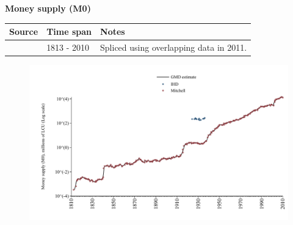 \documentclass[12pt,a4paper,landscape]{article}
\begin{document}
\begin{adjustbox}{max totalsize={\paperwidth}{\paperheight},center}
\begin{minipage}[t][\textheight][t]{\textwidth}
\vspace*{0.5cm}
{}
\begin{center}
{\Large\bfseries Money supply (M0)}
\end{center}
\vspace{0.5cm}
\begin{table}[H]
\centering
\small
\begin{tabular}{|l|l|l|}
\hline
\textbf{Source} & \textbf{Time span} & \textbf{Notes} \\
\hline
\rowcolor{white}\cite{Mitchell}& 1813 - 2010 &Spliced using overlapping data in 2011. \\
\hline
\end{tabular}
\end{table}
\begin{figure}[H]
\centering
\includegraphics[width=\textwidth,height=0.6\textheight,keepaspectratio]{graphs/FIN_M0.pdf}
\end{figure}
\end{minipage}
\end{adjustbox}
\end{document}

